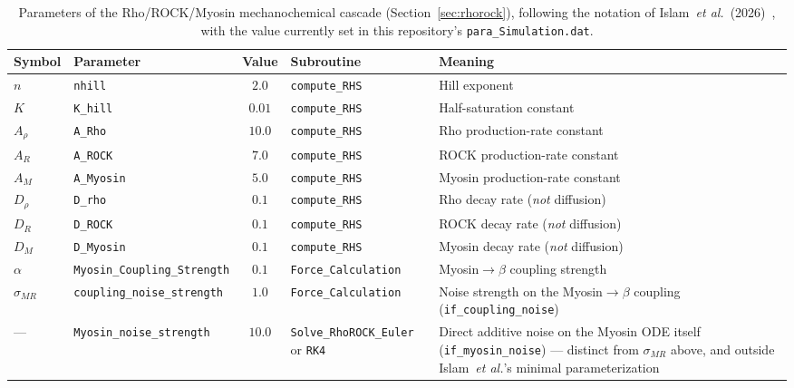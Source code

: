 \documentclass[11pt]{article}
\begin{document}
\begin{table}[htbp]
\centering
\footnotesize
\begin{tabular}{@{}lp{2.3cm}cp{2.3cm}p{4.6cm}@{}}
\toprule
Symbol & Parameter & Value & Subroutine & Meaning \\
\midrule
$n$ & \texttt{nhill} & $2.0$ & \texttt{compute\_RHS} & Hill exponent \\
$K$ & \texttt{K\_hill} & $0.01$ & \texttt{compute\_RHS} & Half-saturation constant \\
$A_\rho$ & \texttt{A\_Rho} & $10.0$ & \texttt{compute\_RHS} & Rho production-rate constant \\
$A_R$ & \texttt{A\_ROCK} & $7.0$ & \texttt{compute\_RHS} & ROCK production-rate constant \\
$A_M$ & \texttt{A\_Myosin} & $5.0$ & \texttt{compute\_RHS} & Myosin production-rate constant \\
$D_\rho$ & \texttt{D\_rho} & $0.1$ & \texttt{compute\_RHS} & Rho decay rate (\emph{not} diffusion) \\
$D_R$ & \texttt{D\_ROCK} & $0.1$ & \texttt{compute\_RHS} & ROCK decay rate (\emph{not} diffusion) \\
$D_M$ & \texttt{D\_Myosin} & $0.1$ & \texttt{compute\_RHS} & Myosin decay rate (\emph{not} diffusion) \\
$\alpha$ & \texttt{Myosin\_\allowbreak Coupling\_\allowbreak Strength} & $0.1$ & \texttt{Force\_\allowbreak Calculation} &
Myosin$\to\beta$ coupling strength \\
$\sigma_{MR}$ & \texttt{coupling\_\allowbreak noise\_\allowbreak strength} & $1.0$ & \texttt{Force\_\allowbreak Calculation} &
Noise strength on the Myosin$\to\beta$ coupling (\texttt{if\_coupling\_noise}) \\
--- & \texttt{Myosin\_\allowbreak noise\_\allowbreak strength} & $10.0$ & \texttt{Solve\_\allowbreak RhoROCK\_\allowbreak Euler} or \texttt{RK4} &
Direct additive noise on the Myosin ODE itself (\texttt{if\_myosin\_noise}) ---
distinct from $\sigma_{MR}$ above, and outside Islam~\emph{et al.}'s minimal
parameterization \\
\bottomrule
\end{tabular}
\normalsize
\caption{Parameters of the Rho/ROCK/Myosin mechanochemical cascade
(Section~\ref{sec:rhorock}), following the notation of Islam~\emph{et
al.}~(2026)~\cite{islam2026}, with the value currently set in this repository's
\texttt{para\_Simulation.dat}.}
\label{tab:rhorock}
\end{table}
\end{document}
